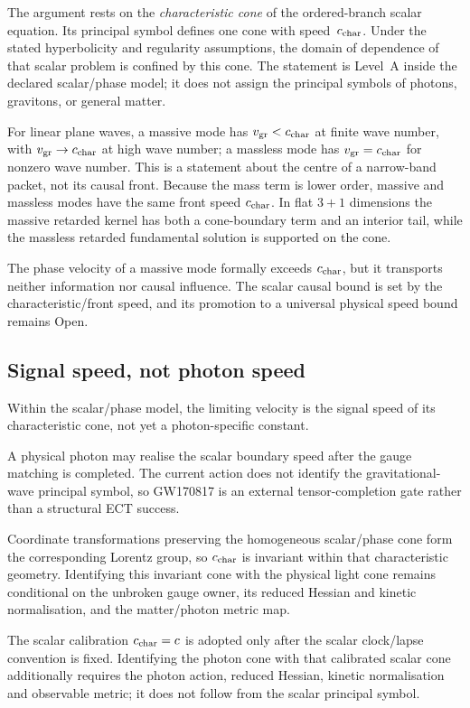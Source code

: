 \documentclass[11pt,a4paper]{article}
\begin{document}
The argument rests on the \emph{characteristic cone} of the ordered-branch scalar equation. Its principal symbol defines one cone with speed~$c_{\rm char}$. Under the stated hyperbolicity and regularity assumptions, the domain of dependence of that scalar problem is confined by this cone. The statement is Level~A inside the declared scalar/phase model; it does not assign the principal symbols of photons, gravitons, or general matter.

For linear plane waves, a massive mode has
$v_{\rm gr}<c_{\rm char}$ at finite wave number, with
$v_{\rm gr}\to c_{\rm char}$ at high wave number; a massless mode has
$v_{\rm gr}=c_{\rm char}$ for nonzero wave number.  This is a statement
about the centre of a narrow-band packet, not its causal front.  Because
the mass term is lower order, massive and massless modes have the same
front speed $c_{\rm char}$.  In flat $3+1$ dimensions the massive retarded
kernel has both a cone-boundary term and an interior tail, while the
massless retarded fundamental solution is supported on the cone.

The phase velocity of a massive mode formally exceeds $c_{\rm char}$,
but it transports neither information nor causal influence.  The scalar
causal bound is set by the characteristic/front speed, and its promotion
to a universal physical speed bound remains Open.

\subsection{Signal speed, not photon speed}

Within the scalar/phase model, the limiting velocity is the signal speed of its characteristic cone, not yet a photon-specific constant.

A physical photon may realise the scalar boundary speed after the gauge matching is completed.  The current action does not identify the gravitational-wave principal symbol, so GW170817 is an external tensor-completion gate rather than a structural ECT success.

Coordinate transformations preserving the homogeneous scalar/phase cone form the corresponding Lorentz group, so $c_{\rm char}$ is invariant within that characteristic geometry. Identifying this invariant cone with the physical light cone remains conditional on the unbroken gauge owner, its reduced Hessian and kinetic normalisation, and the matter/photon metric map.

The scalar calibration $c_{\rm char}=c$ is adopted only after the scalar
clock/lapse convention is fixed.  Identifying the photon cone with that
calibrated scalar cone additionally requires the photon action, reduced
Hessian, kinetic normalisation and observable metric; it does not follow from
the scalar principal symbol.
\end{document}
